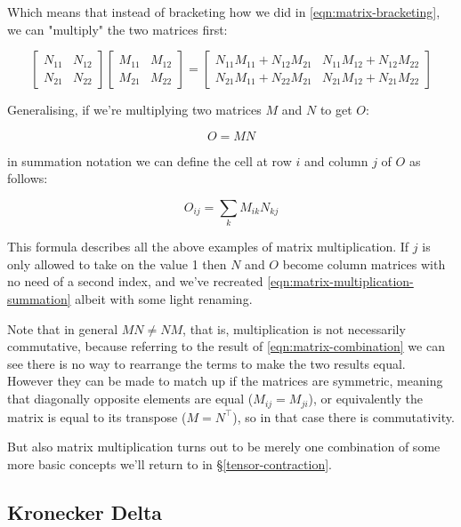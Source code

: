 Which means that instead of bracketing how we did in \eqref{eqn:matrix-bracketing}, we can "multiply" the two matrices first:

\begin{equation}
\begin{bmatrix}
N_{11} & N_{12} \\
N_{21} & N_{22}
\end{bmatrix}
\begin{bmatrix}
M_{11} & M_{12} \\
M_{21} & M_{22}
\end{bmatrix}
=
\begin{bmatrix}
N_{11}M_{11} + N_{12}M_{21} & N_{11}M_{12} + N_{12}M_{22} \\
N_{21}M_{11} + N_{22}M_{21} & N_{21}M_{12} + N_{21}M_{22}
\end{bmatrix}
\label{eqn:matrix-combination}
\end{equation}

Generalising, if we're multiplying two matrices $M$ and $N$ to get $O$:

$$O = MN$$

in summation notation we can define the cell at row $i$ and column $j$ of $O$ as follows:

$$O_{ij} = \sum_k M_{ik} N_{kj}$$

This formula describes all the above examples of matrix multiplication. If $j$ is only allowed to take on the value 1 then $N$ and $O$ become column matrices with no need of a second index, and we've recreated \eqref{eqn:matrix-multiplication-summation} albeit with some light renaming.

Note that in general $MN \ne NM$, that is, multiplication is not necessarily commutative, because referring to the result of \eqref{eqn:matrix-combination} we can see there is no way to rearrange the terms to make the two results equal. However they can be made to match up if the matrices are symmetric, meaning that diagonally opposite elements are equal ($M_{ij} = M_{ji}$), or equivalently the matrix is equal to its transpose ($M = N^\intercal$), so in that case there is commutativity.

But also matrix multiplication turns out to be merely one combination of some more basic concepts we'll return to in §\ref{tensor-contraction}.

\subsection{Kronecker Delta} \label{def:Kronecker}

